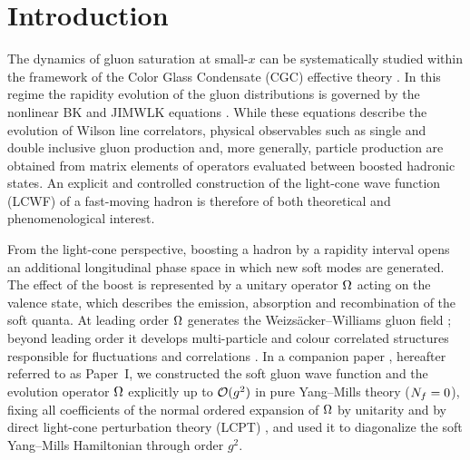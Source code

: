 \section{Introduction}
\label{sec:intro}

The dynamics of gluon saturation \cite{Morreale:2021pnn,Albacete:2014fwa,Blaizot:2016qgz,Mueller:1985wy}
at small-$x$ can be systematically studied within the framework of the Color Glass Condensate
(CGC) effective theory \cite{Gelis:2010nm,Weigert:2005us,McLerran:1993ni,McLerran:1993ka,Balitsky:2001gj,Garcia-Montero:2025hys}.
In this regime the rapidity evolution of the gluon distributions is governed by the nonlinear
BK and JIMWLK equations \cite{Iancu:2001ad,Iancu:2000hn,Weigert:2000gi,Kovner:2000pt,Jalilian-Marian:1997jx,Jalilian-Marian:1997gr,Jalilian-Marian:1996mkd,Kovchegov:1999yj,Kovchegov:1999ua,Lublinsky:2016meo,Kovner:2014lca,Kovner:2013ona}.
While these equations describe the evolution of Wilson line correlators, physical observables
such as single and double inclusive gluon production \cite{Kovner:2011pe,Altinoluk:2018byz} and,
more generally, particle production \cite{Iancu:2020mos,Dominguez:2012ad,Altinoluk:2011qy,Blaizot:2004wv,Kovchegov:2006qn,Dumitru:2005gt}
are obtained from matrix elements of operators evaluated between boosted hadronic states.
An explicit and controlled construction of the light-cone wave function (LCWF) of a fast-moving
hadron is therefore of both theoretical and phenomenological interest.

From the light-cone perspective, boosting a hadron by a rapidity interval opens an additional
longitudinal phase space in which new soft modes are generated. The effect of the boost is
represented by a unitary operator $\Omega$ acting on the valence state, which describes the
emission, absorption and recombination of the soft quanta. At leading order $\Omega$ generates the
Weizs\"acker--Williams gluon field \cite{Kovner:2005pe,Kovner:2006wr}; beyond leading order it
develops multi-particle and colour correlated structures responsible for fluctuations and
correlations \cite{Kovner:2016jfp}. In a companion paper \cite{PaperI}, hereafter referred to as
Paper~I, we constructed the soft gluon wave function and the evolution operator $\Omega$ explicitly
up to $\mathcal{O}(g^{2})$ in pure Yang--Mills theory ($N_{f}=0$), fixing all coefficients of the
normal ordered expansion of $\Omega$ by unitarity and by direct light-cone perturbation theory
(LCPT) \cite{Lepage:1980fj,Brodsky:1997de,Munier:2025unitary}, and used it to diagonalize the
soft Yang--Mills Hamiltonian through order $g^{2}$.

